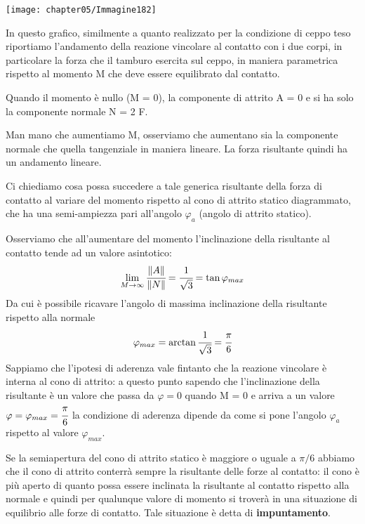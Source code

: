 \begin{minipage}{.35\textwidth}
\centering
\texttt{[image: chapter05/Immagine182]}
\end{minipage}
\hfill
\begin{minipage}{.65\textwidth}
In questo grafico, similmente a quanto realizzato per la condizione di ceppo teso riportiamo l'andamento della reazione vincolare al contatto con i due corpi, in particolare la forza che il tamburo esercita sul ceppo, in maniera parametrica rispetto al momento M che deve essere equilibrato dal contatto.

Quando il momento è nullo (M = 0), la componente di attrito A = 0  e si ha solo la componente normale N = 2 F.

Man mano che aumentiamo M, osserviamo che aumentano sia la componente normale che quella tangenziale in maniera lineare. La forza risultante quindi ha un andamento lineare.
\end{minipage}
\vspace{1mm}

Ci chiediamo cosa possa succedere a tale generica risultante della forza di contatto al variare del momento rispetto al cono di attrito statico diagrammato, che ha una semi-ampiezza pari all'angolo $\varphi_a$ (angolo di attrito statico).

Osserviamo che all'aumentare del momento l'inclinazione della risultante al contatto tende ad un valore asintotico:
\[\lim_{M \to \infty}\cfrac{\lVert A\rVert}{\lVert N\rVert} = \cfrac{1}{\sqrt{3}} = \tan{\varphi_{max}}\]
Da cui è possibile ricavare l'angolo di massima inclinazione della risultante rispetto alla normale
\[\varphi_{max} = \arctan{\cfrac{1}{\sqrt{3}}} = \cfrac{\pi}{6}\]
Sappiamo che l'ipotesi di aderenza vale fintanto che la reazione vincolare è interna al cono di attrito: a questo punto sapendo che l'inclinazione della risultante è un valore che passa da $\varphi = 0$ quando M = 0 e arriva a un valore $\varphi = \varphi_{max} = \cfrac{\pi}{6}$ la condizione di aderenza dipende da come si pone l'angolo $\varphi_a$ rispetto al valore $\varphi_{max}$.

Se la semiapertura del cono di attrito statico è maggiore o uguale a $\pi/6$ abbiamo che il cono di attrito conterrà sempre la risultante delle forze al contatto: il cono è più aperto di quanto possa essere inclinata la risultante al contatto rispetto alla normale e quindi per qualunque valore di momento si troverà in una situazione di equilibrio alle forze di contatto. Tale situazione è detta di \textbf{impuntamento}.

